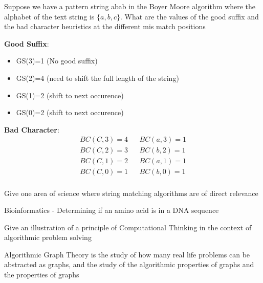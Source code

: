 \documentclass[addpoints]{exam}
\begin{document}
\begin{questions}
\newpage
\question[7]Suppose we have a pattern string abab in the Boyer Moore algorithm where the alphabet of the text string is $\{a,b,c\}$. What are the values of the good suffix and the bad character heuristics at the different mis match positions
\begin{solution}[2in]
\textbf{Good Suffix}:
\begin{itemize}
	\item GS(3)=1 (No good suffix)
	\item GS(2)=4 (need to shift the full length of the string)
	\item GS(1)=2 (shift to next occurence)
	\item GS(0)=2 (shift to next occurence)
\end{itemize}
\textbf{Bad Character}:
\begin{align*}
BC(C,3)=4&&BC(a,3)=1\\
BC(C,2)=3&&BC(b,2)=1\\
BC(C,1)=2&&BC(a,1)=1\\
BC(C,0)=1&&BC(b,0)=1\\
\end{align*}
\end{solution}

\question[1]Give one area of science where string matching algorithms are of direct relevance
\begin{solution}[2in]
	Bioinformatics - Determining if an amino acid is in a DNA sequence
\end{solution}


\question[2]Give an illustration of a principle of Computational Thinking in the context of algorithmic problem solving
\begin{solution}[2in]
	Algorithmic Graph Theory is the study of how many real life problems can be abstracted as graphs, and the study of the algorithmic properties of graphs and the properties of graphs
\end{solution}

\end{questions}

	
	
	
	
\end{document}
